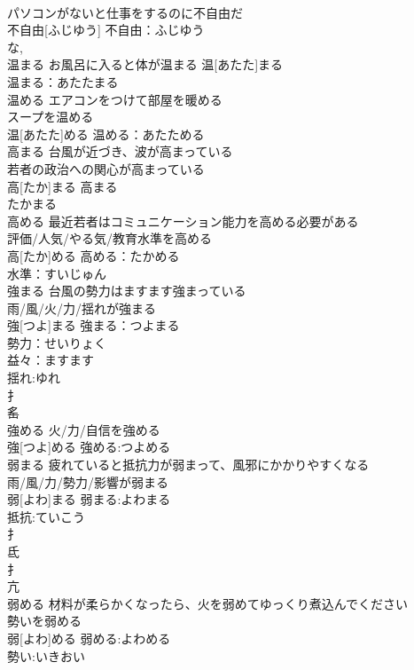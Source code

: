 \documentclass[8pt]{extreport}
\begin{document}
\begin{CJK}{UTF8}{min}
\\	パソコンがないと仕事をするのに不自由だ 
\\	不自由[ふじゆう]			不自由：ふじゆう
\\	な, 
\\	温まる	お風呂に入ると体が温まる	温[あたた]まる	
\\	温まる：あたたまる
\\	温める	エアコンをつけて部屋を暖める 
\\	スープを温める 
\\	温[あたた]める			温める：あたためる
\\	高まる	台風が近づき、波が高まっている 
\\	若者の政治への関心が高まっている 
\\	高[たか]まる			高まる 
\\	たかまる 
\\	高める	最近若者はコミュニケーション能力を高める必要がある 
\\	評価/人気/やる気/教育水準を高める 
\\	高[たか]める			高める：たかめる
\\	水準：すいじゅん
\\	強まる	台風の勢力はますます強まっている 
\\	雨/風/火/力/揺れが強まる 
\\	強[つよ]まる			強まる：つよまる
\\	勢力：せいりょく
\\	益々：ますます
\\	揺れ:ゆれ
\\	扌 
\\	䍃	
\\	強める	火/力/自信を強める 
\\	強[つよ]める			強める:つよめる
\\	弱まる	疲れていると抵抗力が弱まって、風邪にかかりやすくなる 
\\	雨/風/力/勢力/影響が弱まる 
\\	弱[よわ]まる			弱まる:よわまる
\\	抵抗:ていこう
\\	扌 
\\	氐 
\\	扌 
\\	亢 
\\	弱める	材料が柔らかくなったら、火を弱めてゆっくり煮込んでください 
\\	勢いを弱める 
\\	弱[よわ]める			弱める:よわめる
\\	勢い:いきおい

\end{CJK}
\end{document}
